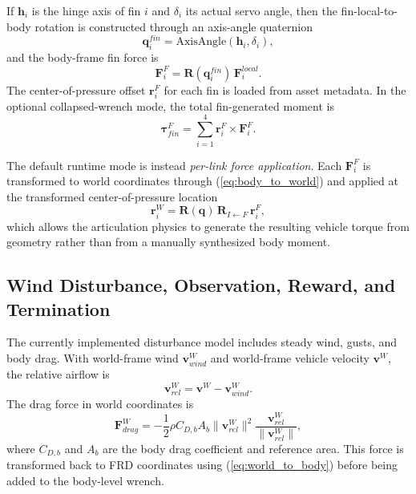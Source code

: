 \documentclass[10pt,twocolumn]{article}
\begin{document}
If $\mathbf{h}_i$ is the hinge axis of fin $i$ and $\delta_i$ its actual servo angle, then the fin-local-to-body rotation is constructed through an axis-angle quaternion
\begin{equation}
\mathbf{q}_{i}^{fin} = \mathrm{AxisAngle}(\mathbf{h}_i,\delta_i),
\label{eq:axis_angle_fin}
\end{equation}
and the body-frame fin force is
\begin{equation}
\mathbf{F}_{i}^{F} = \mathbf{R}(\mathbf{q}_{i}^{fin})\,\mathbf{F}_{i}^{local}.
\label{eq:body_fin_force}
\end{equation}
The center-of-pressure offset $\mathbf{r}_i^{F}$ for each fin is loaded from asset metadata. In the optional collapsed-wrench mode, the total fin-generated moment is
\begin{equation}
\boldsymbol{\tau}^{F}_{fin} = \sum_{i=1}^{4}\mathbf{r}_i^{F}\times \mathbf{F}_{i}^{F}.
\label{eq:collapsed_torque}
\end{equation}

The default runtime mode is instead \emph{per-link force application}. Each $\mathbf{F}_{i}^{F}$ is transformed to world coordinates through (\ref{eq:body_to_world}) and applied at the transformed center-of-pressure location
\begin{equation}
\mathbf{r}_{i}^{W} = \mathbf{R}(\mathbf{q})\,\mathbf{R}_{I\leftarrow F}\,\mathbf{r}_i^{F},
\label{eq:cop_world}
\end{equation}
which allows the articulation physics to generate the resulting vehicle torque from geometry rather than from a manually synthesized body moment.

\subsection{Wind Disturbance, Observation, Reward, and Termination}

The currently implemented disturbance model includes steady wind, gusts, and body drag. With world-frame wind $\mathbf{v}^{W}_{wind}$ and world-frame vehicle velocity $\mathbf{v}^{W}$, the relative airflow is
\begin{equation}
\mathbf{v}^{W}_{rel} = \mathbf{v}^{W} - \mathbf{v}^{W}_{wind}.
\label{eq:vrel}
\end{equation}
The drag force in world coordinates is
\begin{equation}
\mathbf{F}^{W}_{drag} =
-\frac{1}{2}\rho C_{D,b}A_b \lVert \mathbf{v}^{W}_{rel}\rVert^2
\frac{\mathbf{v}^{W}_{rel}}{\lVert \mathbf{v}^{W}_{rel}\rVert},
\label{eq:drag_world}
\end{equation}
where $C_{D,b}$ and $A_b$ are the body drag coefficient and reference area. This force is transformed back to FRD coordinates using (\ref{eq:world_to_body}) before being added to the body-level wrench.
\end{document}
